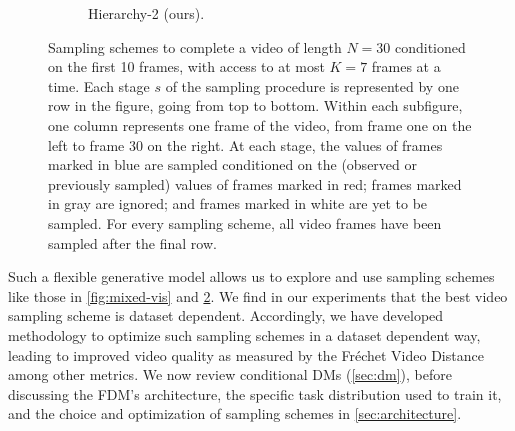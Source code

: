 \begin{figure}[t!]
\begin{subfigure}[t]{0.24\textwidth}
        \caption{Hierarchy-2 (ours).} \label{fig:hierarchy-vis}
    \end{subfigure}%
    \caption{Sampling schemes to complete a video of length $N=30$ conditioned on the first 10 frames, with access to at most $K=7$ frames at a time. Each stage $s$ of the sampling procedure is represented by one row in the figure, going from top to bottom. Within each subfigure, one column represents one frame of the video, from frame one on the left to frame 30 on the right. At each stage, the values of frames marked in blue are sampled conditioned on the (observed or previously sampled) values of frames marked in red; frames marked in gray are ignored; and frames marked in white are yet to be sampled. For every sampling scheme, all video frames have been sampled after the final row.
    }
\end{figure}


Such a flexible generative model allows us to explore and use sampling schemes like those in \cref{fig:mixed-vis} and \cref{fig:hierarchy-vis}.  We find in our experiments that the best video sampling scheme is dataset dependent. Accordingly, we have developed methodology to optimize such sampling schemes in a dataset dependent way, leading to improved video quality as measured by the Fréchet Video Distance~\cite{unterthiner2018towards} among other metrics. We now review conditional DMs (\cref{sec:dm}), before discussing the FDM's architecture, the specific task distribution  used to train it, and the choice and optimization of sampling schemes in \cref{sec:architecture}.

